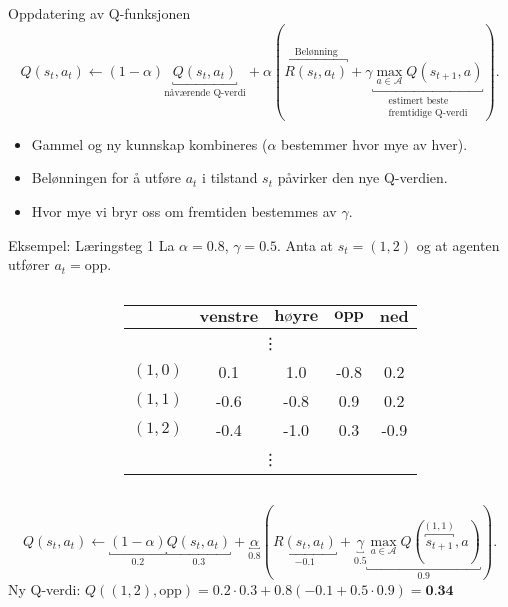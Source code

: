 \documentclass[UKenglish]{beamer}
\begin{document}
\begin{frame}{Oppdatering av Q-funksjonen}
	$$
	Q(s_t, a_t)\leftarrow(1-\alpha)\underbracket{Q(s_t, a_t)}_{\text{nåværende Q-verdi}}+\alpha\left(\overbracket{R(s_t, a_t)}^{\text{Belønning}}+\gamma\underbracket{\max_{a\in\mathcal{A}} Q(s_{t+1}, a)}_{\substack{\text{estimert beste}\\ \text{fremtidige Q-verdi}}}\right).
	$$
	\begin{itemize}
		\setlength\itemsep{2em}
		\item Gammel og ny kunnskap kombineres ($\alpha$ bestemmer hvor mye av hver).
		\item Belønningen for å utføre $a_t$ i tilstand $s_t$ påvirker den nye Q-verdien.
		\item Hvor mye vi bryr oss om fremtiden bestemmes av $\gamma$.
	\end{itemize}
\end{frame}

\begin{frame}{Eksempel: Læringsteg 1}
	La $\alpha=0.8$, $\gamma=0.5$. Anta at $s_t=(1,2)$ og at agenten utfører $a_t=\text{opp}$.
	\vspace{-1em}
	\begin{columns}
	\begin{column}{0.4\textwidth}
	\begin{center}
	
	\end{center}
	\end{column}
	\begin{column}{0.6\textwidth}%
	\begin{table}[!hbt]
		\centering
		\def\arraystretch{1.0}
		\setlength{}
		\begin{tabular}{|c|c|c|c|c|}\hline
			\diagbox{$\textbf{s}$}{$\textbf{a}$} & $\textbf{venstre}$ & $\textbf{høyre}$ & $\textbf{opp}$ & $\textbf{ned}$\\ \hline
			\multicolumn{5}{|c|}{\vdots} \\ \hline
			$(1,0)$ & 0.1 & 1.0 & -0.8 & 0.2 \\ \hline
			$(1,1)$ & -0.6 & -0.8 & 0.9 & 0.2 \\ \hline
			\rowcolor{orange!35}$(1,2)$ & -0.4 & -1.0 & \cellcolor{orange!70}0.3 & -0.9 \\ \hline
			\multicolumn{5}{|c|}{\vdots}\\ \hline
		\end{tabular}
	\end{table}
	\end{column}
	\end{columns}		
	$$
	Q(s_t, a_t)\leftarrow\underbracket{(1-\alpha)}_{0.2}\underbracket{Q(s_t, a_t)}_{0.3}+\underbracket{\alpha}_{0.8}\left(\underbracket{R(s_t, a_t)}_{-0.1}+\underbracket{\gamma}_{0.5}\underbracket{\max_{a\in\mathcal{A}} Q(\overbracket{s_{t+1}}^{(1,1)}, a)}_{0.9}\right).
	$$
	Ny Q-verdi: $Q((1,2), \text{opp})=0.2\cdot0.3+0.8(-0.1+0.5\cdot0.9)=\textbf{0.34}$
\end{frame}
\end{document}
